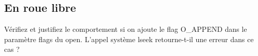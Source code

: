 \subsection{En roue libre}
Vérifiez et justifiez le comportement si on ajoute le flag O\_APPEND dans le paramètre flags du open. L'appel système lseek retourne-t-il une erreur dans ce cas ?

\newpage
